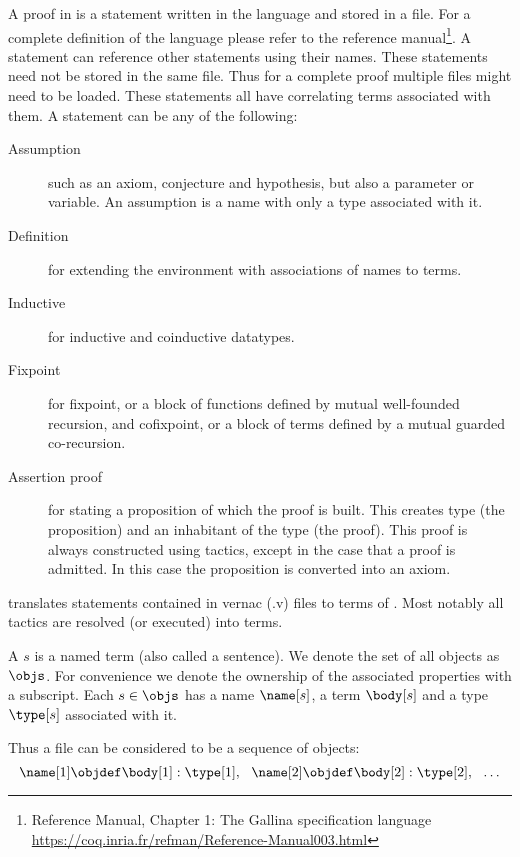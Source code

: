 A proof in \coq is a statement written in the \gallina language \cite{huet1992gallina} and stored in a file.
For a complete definition of the \gallina language please refer to the \coq reference manual\footnote{\coq Reference Manual, Chapter 1: The Gallina specification language\\ \url{https://coq.inria.fr/refman/Reference-Manual003.html}}.
A statement can reference other statements using their names.
These statements need not be stored in the same file.
Thus for a complete proof multiple files might need to be loaded.
These statements all have correlating \pcic terms associated with them.
A statement can be any of the following:
\begin{description}
	\item[Assumption] such as an axiom, conjecture and hypothesis, but also a parameter or variable.
		An assumption is a name with only a type associated with it.
	\item[Definition] for extending the environment with associations of names to terms.
	\item[Inductive] for inductive and coinductive datatypes.
	\item[Fixpoint] for fixpoint, or a block of functions defined by mutual well-founded recursion, and cofixpoint, or a block of terms defined by a mutual guarded co-recursion.
	\item[Assertion proof] for stating a proposition of which the proof is built.
		This creates type (the proposition) and an inhabitant of the type (the proof).
		This proof is always constructed using tactics, except in the case that a proof is admitted.
		In this case the proposition is converted into an axiom.
\end{description}

\coq translates \gallina statements contained in \coq vernac (.v) files to terms of \pcic.
Most notably all tactics are resolved (or executed) into terms.

\begin{definition}[{\coqobj[s]}]
	A \coqobj $s$ is a named term (also called a sentence).
	We denote the set of all \coq objects as $\objs$.
	For convenience we denote the ownership of the associated properties with a subscript.
	Each \coqobj $s \in \objs$ has a name $\name[s]$, a term $\body[s]$ and a type $\type[s]$ associated with it.
\end{definition}


Thus a \coq file can be considered to be a sequence of \coq objects:
$$ \name[1] \objdef \body[1] : \type[1], ~~ \name[2] \objdef \body[2] : \type[2], ~~ \ldots $$

